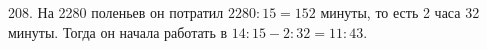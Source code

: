 208. На 2280 поленьев он потратил $2280:15=152$ минуты, то есть 2 часа 32 минуты. Тогда он начала работать в  $14:15-2:32=11:43.$\\
